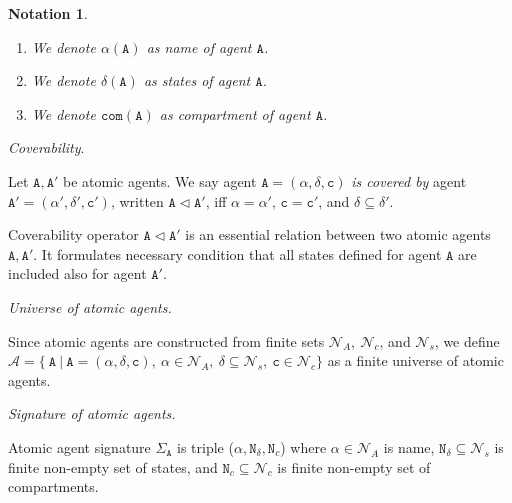 \documentclass{elsarticle}
\newtheorem{notation}{Notation}
\begin{document}
\begin{notation}
~

\begin{enumerate}
\item We denote $\alpha(\mathtt{A})$ as name of agent $\mathtt{A}$.
\item We denote $\delta(\mathtt{A})$ as states of agent $\mathtt{A}$.
\item We denote $\mathtt{com}(\mathtt{A})$ as compartment of agent $\mathtt{A}$.
\end{enumerate}
\end{notation}

\begin{definition}
\textit{Coverability}.  

\noindent Let $\mathtt{A},\mathtt{A}'$ be atomic agents. We say agent $\mathtt{A}=(\alpha, \delta, \mathtt{c})$ \emph{is covered by} agent $\mathtt{A}'=(\alpha', \delta', \mathtt{c}')$, written $\mathtt{A} \lhd \mathtt{A}'$, iff $\alpha = \alpha'$, $\mathtt{c} = \mathtt{c}'$, and $\delta \subseteq \delta'$.
\end{definition}

Coverability operator $\mathtt{A} \lhd \mathtt{A}'$ is an essential relation between two atomic agents $\mathtt{A},\mathtt{A}'$. It formulates necessary condition that all states defined for agent $\mathtt{A}$ are included also for agent $\mathtt{A}'$.

\begin{definition}
\textit{Universe of atomic agents.}  

\noindent Since atomic agents are constructed from finite sets $\mathcal{N}_{A},~\mathcal{N}_{c}$, and $\mathcal{N}_{s}$, we define $\mathcal{A} = \{ ~\mathtt{A}~|~\mathtt{A} = (\alpha, \delta, \mathtt{c}),~\alpha \in \mathcal{N}_{A},~\delta \subseteq \mathcal{N}_{s},~\mathtt{c} \in \mathcal{N}_{c} \}$ as a finite universe of atomic agents. 
\end{definition}

\begin{definition}
\textit{Signature of atomic agents.} 

Atomic agent signature $\Sigma_\mathtt{A}$ is triple ($\alpha, \mathtt{N}_\delta, \mathtt{N}_c$) where $\alpha \in \mathcal{N}_{A}$ is name, $\mathtt{N}_\delta \subseteq \mathcal{N}_{s}$ is finite non-empty set of states, and $\mathtt{N}_c \subseteq \mathcal{N}_{c}$ is finite non-empty set of compartments. 
\end{definition}
\end{document}
